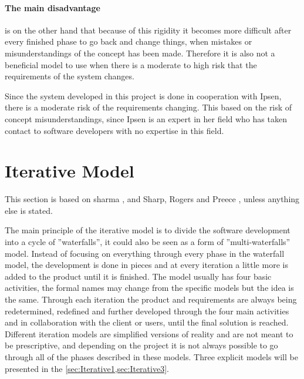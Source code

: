 \paragraph{The main disadvantage} is on the other hand that because of this rigidity it becomes more difficult after every finished phase to go back and change things, when mistakes or misunderstandings of the concept has been made.
Therefore it is also not a beneficial model to use when there is a moderate to high risk that the requirements of the system changes.

Since the system developed in this project is done in cooperation with Ipsen, there is a moderate risk of the requirements changing.
This based on the risk of concept misunderstandings, since Ipsen is an expert in her field who has taken contact to software developers with no expertise in this field.

\section{Iterative Model} \label{sec:iterativModel}
This section is based on sharma \cite{Iterative-Toolsqa} , and Sharp, Rogers and Preece \cite{InteractionDesign}, unless anything else is stated.

The main principle of the iterative model is to divide the software development into a cycle of ''waterfalls'', it could also be seen as a form of ''multi-waterfalls'' model.
Instead of focusing on everything through every phase in the waterfall model, the development is done in pieces and at every iteration a little more is added to the product until it is finished.
The model usually has four basic activities, the formal names may change from the specific models but the idea is the same. 
Through each iteration the product and requirements are always being redetermined, redefined and further developed through the four main activities and in collaboration with the client or users, until the final solution is reached.
Different iteration models are simplified versions of reality and are not meant to be prescriptive, and depending on the project it is not always possible to go through all of the phases described in these models. 
Three explicit models will be presented in the \cref{sec:Iterative1,sec:Iterative3}.


